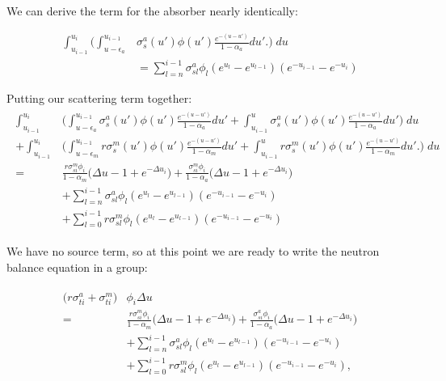 \documentclass{article}
\begin{document}
         We can derive the term for the absorber nearly identically:

         \begin{align}
             \int_{u_{i-1}}^{u_{i}} 
            \bigg(  
                \int_{u - \epsilon_a}^{u_{i-1}} & \sigma_s^a(u')\phi(u') \frac{e^{-(u-u')}}{1 - \alpha_a}du'.
            \bigg)  \; du   \\ &=
            \sum_{l = n}^{i-1} \sigma_{sl}^a \phi_l  (e^{u_l} - e^{u_{l-1}}) (e^{-u_{i-1}} - e^{-u_{i}}) 
         \end{align}

         Putting our scattering term together:
        \begin{align}
        \begin{split}
            \int_{u_{i-1}}^{u_{i}} &
            \bigg(  
                \int_{u - \epsilon_a}^{u_{i-1}} \sigma_s^a(u')\phi(u') \frac{e^{-(u-u')}}{1 - \alpha_a}du'  +
                \int_{u_{i-1}}^{u} \sigma_s^a(u')\phi(u') \frac{e^{-(u-u')}}{1 - \alpha_a}du'  
            \bigg)  \; du \\ +
            \int_{u_{i-1}}^{u_{i}} &
            \bigg(  
                \int_{u - \epsilon_m}^{u_{i-1}} r \sigma_s^m(u')\phi(u') \frac{e^{-(u-u')}}{1 - \alpha_m}du' +
                \int_{u_{i-1}}^{u} r \sigma_s^m(u')\phi(u') \frac{e^{-(u-u')}}{1 - \alpha_m}du'.
            \bigg)  \; du  \\ = 
            &\frac{r \sigma_{si}^m \phi_i}{1-\alpha_m} \big( \Delta u -1 + e^{-\Delta u_i} \big)+
            \frac{\sigma_{si}^m \phi_i}{1-\alpha_a} \big( \Delta u -1 + e^{-\Delta u_i} \big) \\ 
            & + \sum_{l = n}^{i-1} \sigma_{sl}^a \phi_l  (e^{u_l} - e^{u_{l-1}})   (e^{-u_{i-1}} - e^{-u_{i}}) \\ 
            & + \sum_{l = 0}^{i-1} r \sigma_{sl}^m \phi_l  (e^{u_l} - e^{u_{l-1}}) (e^{-u_{i-1}} - e^{-u_{i}}) 
        \end{split}
        \end{align}

        We have no source term, so at this point we are ready to write the neutron balance equation in a 
        group:

        \begin{align}
        \begin{split}
            \label{eq:balance_group}
            \big( r \sigma_{ti}^a + \sigma_{ti}^m  \big) &\phi_i \Delta u \\=
            &\frac{r \sigma_{si}^m \phi_i}{1-\alpha_m} \big( \Delta u -1 + e^{-\Delta u_i} \big)+
            \frac{\sigma_{si}^a \phi_i}{1-\alpha_a} \big( \Delta u -1 + e^{-\Delta u_i} \big) \\ 
            & + \sum_{l = n}^{i-1} \sigma_{sl}^a \phi_l  (e^{u_l} - e^{u_{l-1}})   (e^{-u_{i-1}} - e^{-u_{i}}) \\ 
            & + \sum_{l = 0}^{i-1} r \sigma_{sl}^m \phi_l  (e^{u_l} - e^{u_{l-1}}) (e^{-u_{i-1}} - e^{-u_{i}}) ,
        \end{split}
        \end{align}
\end{document}
